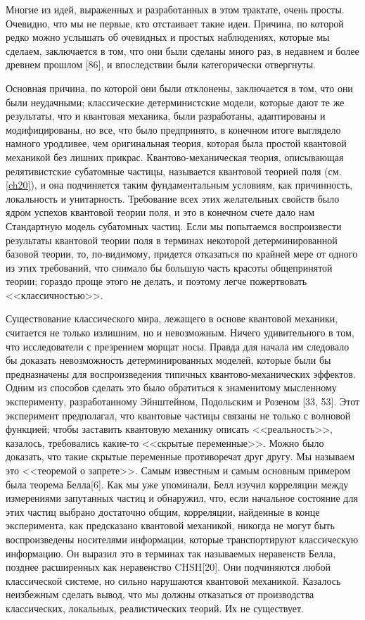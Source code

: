 \documentclass[main.tex]{subfiles}
\begin{document}
Многие из идей, выраженных и разработанных в этом трактате, очень просты. Очевидно, что мы не первые, кто отстаивает такие идеи. Причина, по которой редко можно услышать об очевидных и простых наблюдениях, которые мы сделаем, заключается в том, что они были сделаны много раз, в недавнем и более древнем прошлом [86], и впоследствии были категорически отвергнуты.

Основная причина, по которой они были отклонены, заключается в том, что они были неудачными; классические детерминистские модели, которые дают те же результаты, что и квантовая механика, были разработаны, адаптированы и модифицированы, но все, что было предпринято, в конечном итоге выглядело намного уродливее, чем оригинальная теория, которая была простой квантовой механикой без лишних прикрас. Квантово-механическая теория, описывающая релятивистские субатомные частицы, называется квантовой теорией поля (см. \ref{ch20}), и она подчиняется таким фундаментальным условиям, как причинность, локальность и унитарность. Требование всех этих желательных свойств было ядром успехов квантовой теории поля, и это в конечном счете дало нам Стандартную модель субатомных частиц. Если мы попытаемся воспроизвести результаты квантовой теории поля в терминах некоторой детерминированной базовой теории, то, по-видимому, придется отказаться по крайней мере от одного из этих требований, что снимало бы большую часть красоты общепринятой теории; гораздо проще этого не делать, и поэтому легче пожертвовать <<классичностью>>. 

Существование классического мира, лежащего в основе квантовой механики, считается не только излишним, но и невозможным. Ничего удивительного в том, что исследователи с презрением морщат носы. Правда для начала им следовало бы доказать невозможность детерминированных моделей, которые были бы предназначены для воспроизведения типичных квантово-механических эффектов. Одним из способов сделать это было обратиться к знаменитому мысленному эксперименту, разработанному Эйнштейном, Подольским и Розеном [33, 53]. Этот эксперимент предполагал, что квантовые частицы связаны не только с волновой функцией; чтобы заставить квантовую механику описать <<реальность>>, казалось, требовались какие-то <<скрытые переменные>>. Можно было доказать, что такие скрытые переменные противоречат друг другу. Мы называем это <<теоремой о запрете>>. Самым известным и самым основным примером была теорема Белла[6]. Как мы уже упоминали, Белл изучил корреляции между измерениями запутанных частиц и обнаружил, что, если начальное состояние для этих частиц выбрано достаточно общим, корреляции, найденные в конце эксперимента, как предсказано квантовой механикой, никогда не могут быть воспроизведены носителями информации, которые транспортируют классическую информацию. Он выразил это в терминах так называемых неравенств Белла, позднее расширенных как неравенство CHSH[20]. Они подчиняются любой классической системе, но сильно нарушаются квантовой механикой. Казалось неизбежным сделать вывод, что мы должны отказаться от производства классических, локальных, реалистических теорий. Их не существует. 
\end{document}
